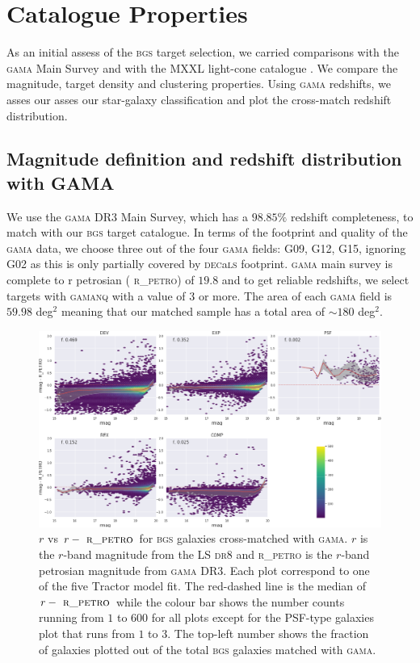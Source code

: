 \documentclass[fleqn,usenatbib]{mnras}
\newcommand{\BGS}{\textsc{bgs}\xspace}
\newcommand{\DECaLS}{\textsc{dec}a\textsc{ls}\xspace}
\newcommand{\DReight}{\textsc{dr8}\xspace}
\newcommand{\GAMA}{\textsc{gama}\xspace}
\newcommand{\NQ}{\textsc{nq}\xspace}
\newcommand{\RPETRO}{{\textsc{ r\_petro}}\xspace}
\newcommand{\TRACTOR}{\textsc{T}ractor\xspace}
\begin{document}
\section{Catalogue Properties}
As an initial assess of the \BGS target selection, we carried comparisons with the \GAMA Main Survey \citep{10.1093/mnras/stx3042} and with the MXXL light-cone catalogue \citep{Smith:2017tzz}. We compare the magnitude, target density and clustering properties. Using \GAMA redshifts, we asses our asses our star-galaxy classification and plot the cross-match redshift distribution. 

\subsection{Magnitude definition and redshift distribution with GAMA}

We use the \GAMA DR3 Main Survey, which has a $98.85 \%$ redshift completeness, to match with our \BGS target catalogue. In terms of the footprint and quality of the \GAMA data, we choose three out of the four \GAMA fields: G09, G12, G15, ignoring G02 as this is only partially covered by \DECaLS footprint. \GAMA main survey is complete to r petrosian (\RPETRO) of $19.8$ and to get reliable redshifts, we select targets with \GAMA \NQ with a value of $3$ or more. The area of each \GAMA field is $59.98$ deg$^2$ meaning that our matched sample has a total area of $\sim 180$ deg$^2$.

\begin{figure}
	\includegraphics[width=17cm]{images/bgs_gama_mag_diff}
    \caption{ $r$ vs $r-\RPETRO$ for \BGS galaxies cross-matched with \GAMA. $r$ is the $r$-band magnitude from the LS \DReight and \RPETRO is the $r$-band petrosian magnitude from \GAMA DR3. Each plot correspond to one of the five \TRACTOR model fit. The red-dashed line is the median of $r-\RPETRO$ while the colour bar shows the number counts running from $1$ to $600$ for all plots except for the PSF-type galaxies plot that runs from $1$ to $3$. The top-left number shows the fraction of galaxies plotted out of the total \BGS galaxies matched with \GAMA.}
    \label{fig:bgs_gama_magdiff}
\end{figure}
\end{document}
